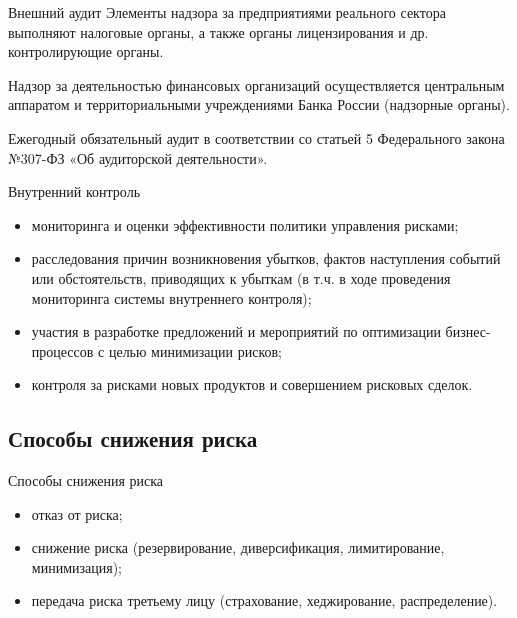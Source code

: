 \documentclass[_fin_decisions_lectures.tex]{subfiles}
\begin{document}
\begin{frame}[allowframebreaks]{Внешний аудит}
Элементы надзора за предприятиями реального сектора выполняют налоговые органы, а также органы лицензирования и др. контролирующие органы.

\pagebreak
Надзор за деятельностью финансовых организаций осуществляется центральным аппаратом и территориальными учреждениями Банка России (надзорные органы).

Ежегодный обязательный аудит в соответствии со статьей 5 Федерального закона №307-ФЗ «Об аудиторской деятельности».
\end{frame}

\begin{frame}[ allowframebreaks ]{Внутренний контроль}
\begin{itemize}
\item
мониторинга и оценки эффективности политики управления рисками;
\item
расследования причин возникновения убытков, фактов наступления событий или обстоятельств, приводящих к убыткам (в т.ч. в ходе проведения мониторинга системы внутреннего контроля);

\pagebreak
\item
участия в разработке предложений и мероприятий по оптимизации бизнес-процессов с целью минимизации рисков;
\item
контроля за рисками новых продуктов и совершением рисковых сделок.
\end{itemize}
\end{frame}
\subsection{Способы снижения риска}
\begin{frame}{Способы снижения риска}
\begin{itemize}
\item
отказ от риска;
\item
снижение риска (резервирование, диверсификация, лимитирование, минимизация);
\item
передача риска третьему лицу (страхование, хеджирование, распределение).
\end{itemize}
\end{frame}
\end{document}

